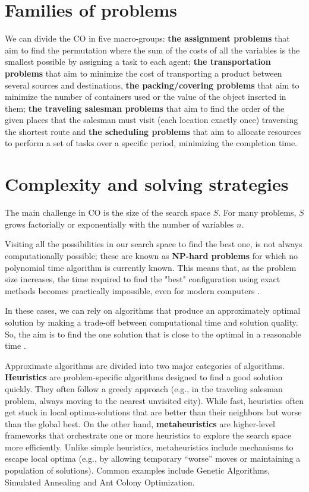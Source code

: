 \section[Families of problems]{Families of problems}

We can divide the CO in five macro-groups: \textbf{the assignment problems} that aim to find the permutation where the sum of the costs of all the variables is the smallest possible by assigning a task to each agent; \textbf{the transportation problems} that aim to minimize the cost of transporting a product between several sources and destinations, \textbf{the packing/covering problems} that aim to minimize the number of containers used or the value of the object inserted in them; \textbf{the traveling salesman problems} that aim to find the order of the given places that the salesman must visit (each location exactly once) traversing the shortest route and \textbf{the scheduling problems} that aim to allocate resources to perform a set of tasks over a specific period, minimizing the completion time.

\section{Complexity and solving strategies}

The main challenge in CO is the size of the search space $S$. For many problems, $S$ grows factorially or exponentially with the number of variables $n$.

Visiting all the possibilities in our search space to find the best one, is not always computationally possible; these are known as \textbf{NP-hard problems} for which no polynomial time algorithm is currently known. This means that, as the problem size increases, the time required to find the "best" configuration using exact methods becomes practically impossible, even for modern computers \cite{blum2003metaheuristics}. 

In these cases, we can rely on algorithms that produce an approximately optimal solution by making a trade-off between computational time and solution quality. So, the aim is to find the one solution that is close to the optimal in a reasonable time \cite{paschos2009overview}.

Approximate algorithms are divided into two major categories of algorithms. \textbf{Heuristics} are problem-specific algorithms designed to find a good solution quickly. They often follow a greedy approach (e.g., in the traveling salesman problem, always moving to the nearest unvisited city). While fast, heuristics often get stuck in local optima-solutions that are better than their neighbors but worse than the global best. On the other hand, \textbf{metaheuristics} are higher-level frameworks that orchestrate one or more heuristics to explore the search space more efficiently. Unlike simple heuristics, metaheuristics include mechanisms to escape local optima (e.g., by allowing temporary ``worse'' moves or maintaining a population of solutions). Common examples include Genetic Algorithms, Simulated Annealing and Ant Colony Optimization.
